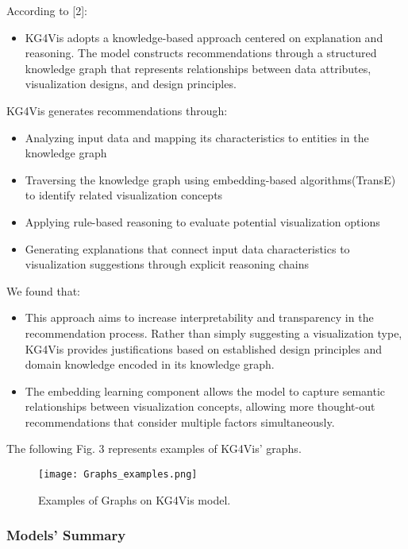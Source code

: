 According to [2]:
\begin{itemize}
\item KG4Vis adopts a knowledge-based approach centered on explanation and reasoning. The model constructs recommendations through a structured knowledge graph that represents relationships between data attributes, visualization designs, and design principles. \par
\end{itemize}
KG4Vis generates recommendations through:
\begin{itemize}
\item Analyzing input data and mapping its characteristics to entities in the knowledge graph
\item Traversing the knowledge graph using embedding-based algorithms\linebreak (TransE) to identify related visualization concepts
\item Applying rule-based reasoning to evaluate potential visualization options
\item Generating explanations that connect input data characteristics to visualization suggestions through explicit reasoning chains
\end{itemize}
\medskip
We found that:
\begin{itemize}
\item This approach aims to increase interpretability and transparency in the recommendation process. Rather than simply suggesting a visualization type, KG4Vis provides justifications based on established design principles and domain knowledge encoded in its knowledge graph.
\item The embedding learning component allows the model to capture semantic relationships between visualization concepts, allowing more thought-out recommendations that consider multiple factors simultaneously.
\end{itemize}
The following Fig. 3 represents examples of KG4Vis' graphs.


\begin{figure}[h]
    \centering
    \texttt{[image: Graphs\_examples.png]}
    \caption{Examples of Graphs on KG4Vis model.}  
    \label{fig:graficos_exemplo}               
\end{figure}

\subsubsection{Models' Summary}

